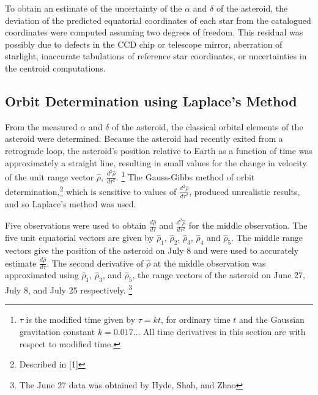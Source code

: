 \documentclass[12pt,journal,compsoc]{IEEEtran}
\begin{document}
To obtain an estimate of the uncertainty of the $\alpha$ and $\delta$ of the asteroid, 
the deviation of the predicted equatorial coordinates of each star 
from the catalogued coordinates were computed assuming two degrees of freedom.
This residual was possibly due to defects in the CCD chip or telescope mirror, 
aberration of starlight, inaccurate tabulations of reference star coordinates, 
or uncertainties in the centroid computations.

\subsection{Orbit Determination using Laplace's Method}
From the measured $\alpha$ and $\delta$ of the asteroid, 
the classical orbital elements of the asteroid were determined. 
Because the asteroid had recently exited from a retrograde loop,
the asteroid's position relative to Earth as a function of time was approximately a straight line,
resulting in small values for the change in velocity
of the unit range vector $\hat{\rho}$, $\frac{d^2\hat{\rho}}{d\tau^2}$.
\footnote{$\tau$ is the modified time given by $\tau=kt$, for ordinary time $t$ 
and the Gaussian gravitation constant $k=0.017...$
All time derivatives in this section are with respect to modified time.}
The Gauss-Gibbs method of orbit determination,\footnote{Described in [1]} which is
sensitive to values of $\frac{d^2\hat{\rho}}{d\tau^2}$, produced unrealistic results, and so Laplace's method was used.

Five observations were used to obtain $\frac{d\hat{\rho}}{d\tau}$ and $\frac{d^2\hat{\rho}}{d\tau^2}$ 
for the middle observation.
The five unit equatorial vectors are given by $\hat{\rho}_1$, $\hat{\rho}_2$, $\hat{\rho}_3$, $\hat{\rho}_4$ 
and $\hat{\rho}_5$. 
The middle range vectors give the position of the asteroid on July 8 
and were used to accurately estimate $\frac{d\hat{\rho}}{d\tau}$.
The second derivative of $\hat{\rho}$ at the middle observation was approximated 
using $\hat{\rho}_1$, $\hat{\rho}_3$, and $\hat{\rho}_5$, 
the range vectors of the asteroid on June 27, July 8, and July 25 respectively.
\footnote{The June 27 data was obtained by Hyde, Shah, and Zhao} 
\end{document}
